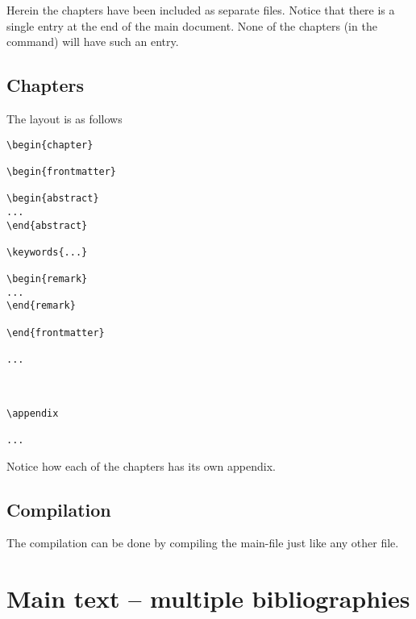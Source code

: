 Herein the chapters have been included as separate files. Notice that there is a single \verb|| entry at the end of the main document. None of the chapters (in the \verb|| command) will have such an entry.

\subsection{Chapters}

The layout is as follows
\begin{mdframed}
\begin{verbatim}
\begin{chapter}

\begin{frontmatter}

\begin{abstract}
...
\end{abstract}

\keywords{...}

\begin{remark}
...
\end{remark}

\end{frontmatter}

...



\appendix

...

\end{verbatim}
\end{mdframed}

Notice how each of the chapters has its own appendix.

\subsection{Compilation}

The compilation can be done by compiling the main-file just like any other file.

\section{Main text -- multiple bibliographies}
\label{sec:sectionbib}


